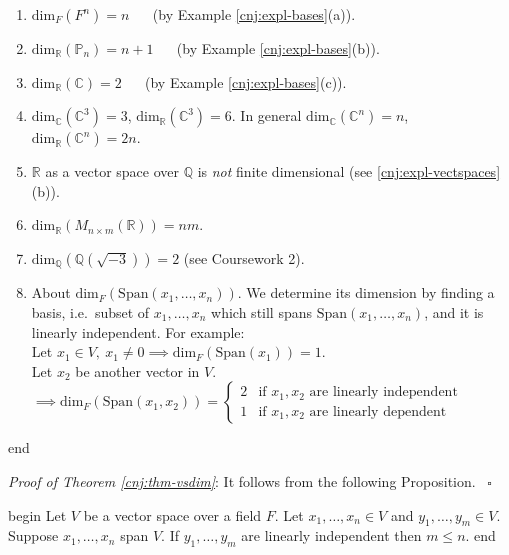\documentclass[
  12pt,
  a4paper,
  twoside]{article}
\providecommand{\tightlist}{%
  \setlength{\itemsep}{0pt}\setlength{\parskip}{0pt}}
\theoremstyle{plain}
\theoremstyle{definition}
\begin{document}
\begin{enumerate}
\def\labelenumi{(\alph{enumi})}
\tightlist
\item
  \(\mathrm{dim}_{F}(F^n)=n\) ~~ (by Example \ref{cnj:expl-bases}(a)).
\item
  \(\mathrm{dim}_{\mathbb{R}}(\mathbb{P}_n) = n + 1\) ~~ (by Example \ref{cnj:expl-bases}(b)).
\item
  \(\mathrm{dim}_{\mathbb{R}}(\mathbb{C}) = 2\) ~~ (by Example \ref{cnj:expl-bases}(c)).
\item
  \(\mathrm{dim}_{\mathbb{C}}(\mathbb{C}^3) = 3\), \(\mathrm{dim}_{\mathbb{R}}(\mathbb{C}^3) = 6\). In general
  \(\mathrm{dim}_{\mathbb{C}}(\mathbb{C}^n) = n\), \(\mathrm{dim}_{\mathbb{R}}(\mathbb{C}^n) = 2n\).
\item
  \(\mathbb{R}\) as a vector space over \(\mathbb{Q}\) is \emph{not} finite dimensional (see \ref{cnj:expl-vectspaces}(b)).
\item
  \(\mathrm{dim}_{\mathbb{R}}(M_{n \times m}(\mathbb{R})) = nm\).
\item
  \(\mathrm{dim}_{\mathbb{Q}}(\mathbb{Q}(\sqrt{-3})) = 2\) (see Coursework 2).
\item
  About \(\mathrm{dim}_F(\mathrm{Span}(x_1,\dots,x_n))\).
  We determine its dimension by finding a basis, i.e.~subset of \(x_1,\dots,x_n\) which still spans
  \(\mathrm{Span}(x_1,\dots,x_n)\), and it is linearly independent. For example:\\
  Let \(x_1 \in V, \ x_1 \neq 0 \implies \mathrm{dim}_{F}(\mathrm{Span}(x_1)) = 1\).\\
  Let \(x_2\) be another vector in \(V\).\\
  \(\implies \mathrm{dim}_{F}(\mathrm{Span}(x_1,x_2)) = \begin{cases} 2 & \text{if } x_1,x_2 \text{ are linearly independent} \\ 1 & \text{if } x_1,x_2 \text{ are linearly dependent} \end{cases}\)
\end{enumerate}

\csname end

\emph{Proof of Theorem \ref{cnj:thm-vsdim}}:
It follows from the following Proposition.
\hfill~{\(\square\)}

\csname begin\label{cnj:prop-vsdim-proof}
Let \(V\) be a vector space over a field \(F\). Let \(x_1, \dots, x_n \in V\) and \(y_1, \dots, y_m \in V\).\\
Suppose \(x_1, \dots, x_n\) span \(V\). If \(y_1, \dots, y_m\) are linearly independent then \(m \leq n\).
\csname end
\end{document}
